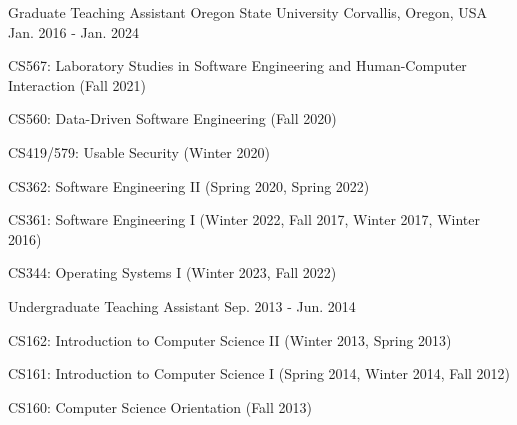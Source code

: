 
\begin{cventries}

  \cventry
    {Graduate Teaching Assistant} %
    {Oregon State University} %
    {Corvallis, Oregon, USA} %
    {Jan. 2016 - Jan. 2024} %
    {
      \begin{cvitems} %
        \item {CS567: Laboratory Studies in Software Engineering and Human-Computer Interaction (Fall 2021)}
        \item {CS560: Data-Driven Software Engineering (Fall 2020)}
        \item {CS419/579: Usable Security (Winter 2020)}
        \item {CS362: Software Engineering II (Spring 2020, Spring 2022)}
        \item {CS361: Software Engineering I (Winter 2022, Fall 2017, Winter 2017, Winter 2016)}
        \item {CS344: Operating Systems I (Winter 2023, Fall 2022)}
      \end{cvitems}
    }

    \cventry
    {Undergraduate Teaching Assistant} %
    {} %
    {} %
    {Sep. 2013 - Jun. 2014} %
    {
      \begin{cvitems} %
        \item {CS162: Introduction to Computer Science II (Winter 2013, Spring 2013)}
        \item {CS161: Introduction to Computer Science I (Spring 2014, Winter 2014, Fall 2012)}
        \item {CS160: Computer Science Orientation (Fall 2013)}
      \end{cvitems}
    }

\end{cventries}

